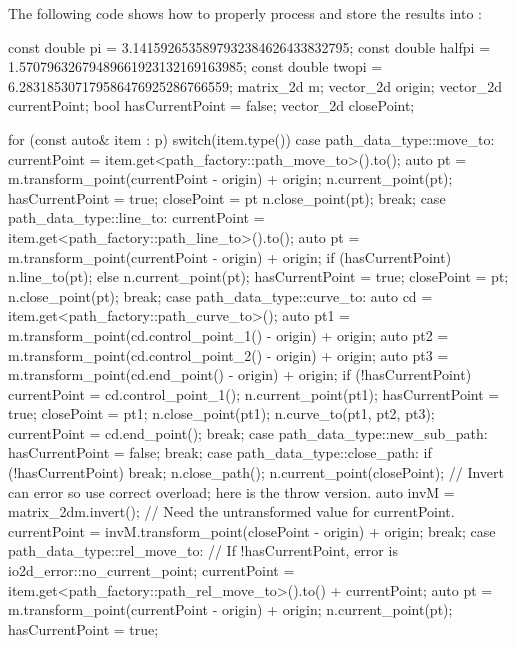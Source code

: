 \pnum
The following code shows how to properly process  and store the results into :

\begin{codeblock}
	const double pi =     3.1415926535897932384626433832795;
	const double halfpi = 1.57079632679489661923132169163985;
	const double twopi =  6.283185307179586476925286766559;
	matrix_2d m;
	vector_2d origin;
	vector_2d currentPoint;
	bool hasCurrentPoint = false;
	vector_2d closePoint;
	
	for (const auto& item : p) {
		switch(item.type()) {
			case path_data_type::move_to:
			{
				currentPoint = item.get<path_factory::path_move_to>().to();
				auto pt = m.transform_point(currentPoint - origin) + origin;
				n.current_point(pt);
				hasCurrentPoint = true;
				closePoint = pt
				n.close_point(pt);
			} break;
			case path_data_type::line_to:
			{
				currentPoint = item.get<path_factory::path_line_to>().to();
				auto pt = m.transform_point(currentPoint - origin) + origin;
				if (hasCurrentPoint) {
					n.line_to(pt);
				}
				else {
					n.current_point(pt);
					hasCurrentPoint = true;
					closePoint = pt;
					n.close_point(pt);
				}
			} break;
			case path_data_type::curve_to:
			{
				auto cd = item.get<path_factory::path_curve_to>();
				auto pt1 = m.transform_point(cd.control_point_1() - origin) + origin;
				auto pt2 = m.transform_point(cd.control_point_2() - origin) + origin;
				auto pt3 = m.transform_point(cd.end_point() - origin) + origin;
				if (!hasCurrentPoint) {
					currentPoint = cd.control_point_1();
					n.current_point(pt1);
					hasCurrentPoint = true;
					closePoint = pt1;
					n.close_point(pt1);
				}
				n.curve_to(pt1, pt2, pt3);
				currentPoint = cd.end_point();
			} break;
			case path_data_type::new_sub_path:
			{
				hasCurrentPoint = false;
			} break;
			case path_data_type::close_path:
			{
				if (!hasCurrentPoint) {
					break;
				}
				n.close_path();
				n.current_point(closePoint);
				// Invert can error so use correct overload; here is the throw version.
				auto invM = matrix_2d{m}.invert();
				// Need the untransformed value for currentPoint.
				currentPoint = invM.transform_point(closePoint - origin) + origin;
			} break;
			case path_data_type::rel_move_to:
			{
				// If !hasCurrentPoint, error is io2d_error::no_current_point;
				currentPoint = item.get<path_factory::path_rel_move_to>().to() + currentPoint;
				auto pt = m.transform_point(currentPoint - origin) + origin;
				n.current_point(pt);
				hasCurrentPoint = true;
}}}
\end{codeblock}
